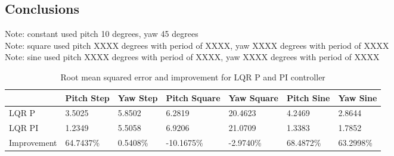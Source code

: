\subsection{Conclusions}
Note: constant used pitch 10 degrees, yaw 45 degrees\\
Note: square used pitch XXXX degrees with period of XXXX, yaw XXXX degrees with period of XXXX\\
Note: sine used pitch XXXX degrees with period of XXXX, yaw XXXX degrees with period of XXXX\\

\begin{table}
    \centering
    \begin{tabular}{l|l|l|l|l|l|l}
        \toprule
        \textbf{} & \textbf{Pitch Step} & \textbf{Yaw Step} & \textbf{Pitch Square} & \textbf{Yaw Square} & \textbf{Pitch Sine} & \textbf{Yaw Sine}\\
        \toprule
        LQR P & 3.5025 & 5.8502 & 6.2819 & 20.4623 & 4.2469 & 2.8644\\
        LQR PI & 1.2349 & 5.5058 & 6.9206 & 21.0709 & 1.3383 & 1.7852\\
        Improvement & 64.7437\% & 0.5408\% & -10.1675\% & -2.9740\% & 68.4872\% & 63.2998\% \\
    \end{tabular}
    \caption{Root mean squared error and improvement for LQR P and PI controller}
    \label{tab:RMSE_P_PI}
\end{table}


